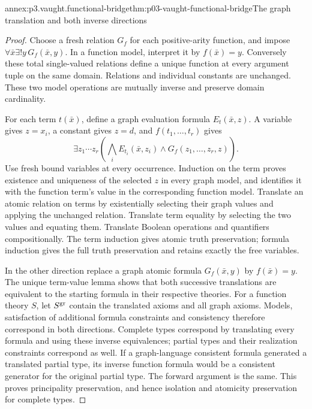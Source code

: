 \begin{annexitem}{annex:p3.vaught.functional-bridge}{thm:p03-vaught-functional-bridge}{The graph translation and both inverse directions}
\begin{proof}
Choose a fresh relation \(G_f\) for each positive-arity function,
and impose
\(\forall\bar x\exists!y\,G_f(\bar x,y)\).
In a function model, interpret it by \(f(\bar x)=y\).
Conversely these total single-valued relations define a unique
function at every argument tuple on the same domain.
Relations and individual constants are unchanged.
These two model operations are mutually inverse and preserve
domain cardinality.

For each term \(t(\bar x)\), define a graph evaluation formula
\(E_t(\bar x,z)\). A variable gives \(z=x_i\), a constant gives
\(z=d\), and \(f(t_1,\ldots,t_r)\) gives
\[
 \exists z_1\cdots z_r
   \left(\bigwedge_i E_{t_i}(\bar x,z_i)
                    \land G_f(z_1,\ldots,z_r,z)\right).
\]
Use fresh bound variables at every occurrence.
Induction on the term proves existence and uniqueness of the
selected \(z\) in every graph model, and identifies it with
the function term's value in the corresponding function model.
Translate an atomic relation on terms by existentially selecting
their graph values and applying the unchanged relation.
Translate term equality by selecting the two values and equating
them. Translate Boolean operations and quantifiers compositionally.
The term induction gives atomic truth preservation; formula
induction gives the full truth preservation and retains exactly
the free variables.

In the other direction replace a graph atomic formula
\(G_f(\bar x,y)\) by \(f(\bar x)=y\).
The unique term-value lemma shows that both successive translations
are equivalent to the starting formula in their respective theories.
For a function theory \(S\), let \(S^{\rm gr}\) contain the
translated axioms and all graph axioms.
Models, satisfaction of additional formula constraints and
consistency therefore correspond in both directions.
Complete types correspond by translating every formula and using
these inverse equivalences; partial types and their realization
constraints correspond as well.
If a graph-language consistent formula generated a translated
partial type, its inverse function formula would be a consistent
generator for the original partial type. The forward argument
is the same. This proves principality preservation, and hence
isolation and atomicity preservation for complete types.


\end{proof}
\end{annexitem}
